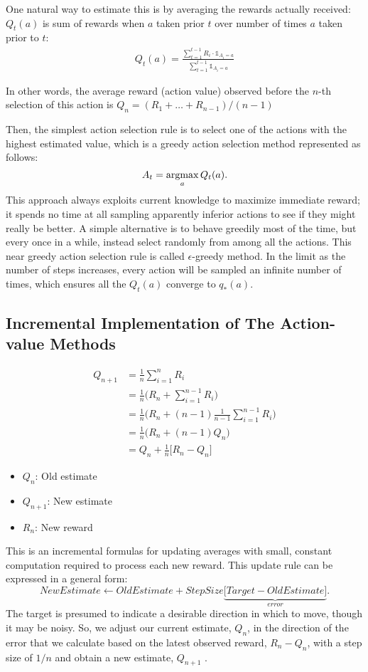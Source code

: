 One natural way to estimate this is by averaging the rewards actually received: $Q_t(a)$ is sum of rewards when $a$ taken prior $t$ over number of times $a$ taken prior to $t$:
\begin{align*}
	Q_t(a) = \frac{\sum_{t=1}^{t-1}R_i \cdot \mathds{1}_{A_i=a}}{\sum_{t=1}^{t-1}\mathds{1}_{A_i=a}}
\end{align*}

In other words, the average reward (action value) observed before the $n$-th selection of this action is $Q_n = (R_1+\dots+R_{n-1})/(n-1)$

Then, the simplest action selection rule is to select one of the actions with the highest estimated value, which is a greedy action selection method represented as follows:
$$A_t=\operatorname*{\operatorname{argmax}}_{a}Q_t(a).$$
This approach always exploits current knowledge to maximize immediate reward; it spends no time at all sampling apparently inferior actions to see if they might really be better. A simple alternative is to behave greedily most of the time, but every once in a while, instead select randomly from among all the actions. This near greedy action selection rule is called $\epsilon$-greedy method. In the limit as the number of steps increases, every action will be sampled an infinite number of times, which ensures all the $Q_t(a)$ converge to $q_*(a)$.

\subsection{Incremental Implementation of The Action-value Methods}
\begin{align*}
	Q_{n+1} &= \frac{1}{n}\sum_{i=1}^{n}R_i\\
	&= \frac{1}{n} \Bigg(R_n + \sum_{i=1}^{n-1}R_i \Bigg)\\
	&= \frac{1}{n} \Bigg(R_n + (n-1)\frac{1}{n-1} \sum_{i=1}^{n-1}R_i \Bigg)\\
	&= \frac{1}{n} \Bigg(R_n + (n-1)Q_n \Bigg)\\
	&=  Q_n + \frac{1}{n} \Big[R_n - Q_n \Big]
\end{align*}
\begin{itemize}
	\item $Q_n$: Old estimate
	\item $Q_{n+1}$: New estimate
	\item $R_{n}$: New reward
\end{itemize}

This is an incremental formulas for updating averages with small, constant computation required to process each new reward. This update rule can be expressed in a general form:
$$NewEstimate \leftarrow OldEstimate + StepSize \underbrace{\Big[Target - OldEstimate \Big]}_{error}.$$
The target is presumed to indicate a desirable direction in which to move, though it may be noisy. So, we adjust our current estimate, $Q_n$, in the direction of the error that we calculate based on the latest observed reward, $R_n-Q_n$, with a step size of $1/n$   and obtain  a new estimate, $Q_{n+1}$ . 


